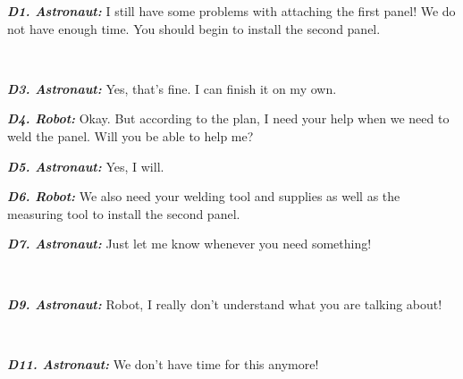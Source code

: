 \begin{description}
  \item \textit{\textbf{D1. Astronaut:}} I still have some problems with
  attaching the first panel! We do not have enough time. You should begin to
  install the second panel.\\

  \item {}\\
  
  \item \textit{\textbf{D3. Astronaut:}} Yes, that's fine. I can finish it on my
  own.\\

  \item \textit{\textbf{D4. Robot:}} Okay. But according to the plan, I need
  your help when we need to weld the panel. Will you be able to help me?\\

  \item \textit{\textbf{D5. Astronaut:}} Yes, I will.\\
  
  \item \textit{\textbf{D6. Robot:}} We also need your welding tool and supplies
  as well as the measuring tool to install the second panel.\\
  
  \item \textit{\textbf{D7. Astronaut:}} Just let me know whenever you need
  something!\\
  
  \item {}\\
  
  \item \textit{\textbf{D9. Astronaut:}} Robot, I really don't understand what
  you are talking about!\\
  
  \item {}\\

  \item \textit{\textbf{D11. Astronaut:}} We don't have time for this anymore!
  
\end{description}

